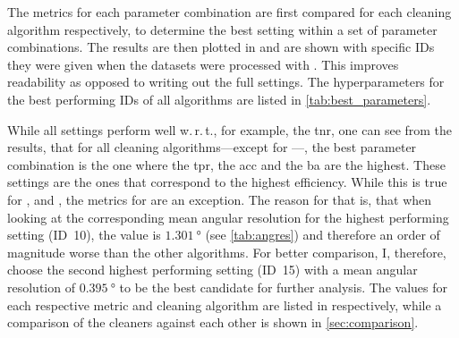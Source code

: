 The metrics for each parameter combination are first compared for each cleaning algorithm respectively,
to determine the best setting within a set of parameter combinations. The results are then plotted in
and are shown with specific IDs they were given when the datasets were processed with \ctapipe.
This improves readability as opposed to writing out the full settings. The hyperparameters for the best performing
IDs of all algorithms are listed in \autoref{tab:best_parameters}.

While all settings perform well w.\,r.\,t., for example, the \gls{tnr}, one can see from the results, that for all cleaning
algorithms---except for \mars{}---, the best parameter combination is the one where the \gls{tpr}, the \gls{acc} and the \gls{ba}
are the highest. These settings are the ones that correspond to the highest efficiency. While this is true
for \tailcuts{}, \fact{} and \tcc{}, the metrics for \mars{} are an exception. The reason for that is, that when
looking at the corresponding mean angular resolution for the highest performing setting (ID~10), the value is
\(\SI{1.301}{\degree}\) (see \autoref{tab:angres}) and therefore an order of magnitude worse than the other algorithms. For better
comparison, I, therefore, choose the second highest performing setting (ID~15) with a mean angular
resolution of \(\SI{0.395}{\degree}\) to be the best candidate for further analysis.
The values for each respective metric and cleaning algorithm are listed in
 respectively, while
a comparison of the cleaners against each other is shown in \autoref{sec:comparison}.
\begin{table}
    \centering
    \caption{Results for the metrics of \tailcuts{}. One can see, that the best results are obtained
    for the settings with ID~47.}
    \label{tab:metrics_tail}
\end{table}

